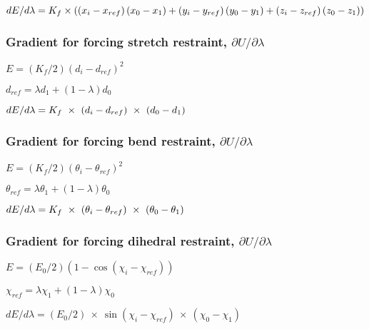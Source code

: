 $dE/d\lambda =K_{f}\times \left( \left( x_{i}-x_{ref}\right) \left(
x_{0}-x_{1}\right) +\left( y_{i}-y_{ref}\right) \left( y_{0}-y_{1}\right)
+\left( z_{i}-z_{ref}\right) \left( z_{0}-z_{1}\right) \right) \bigskip $

\subsubsection{Gradient for forcing stretch restraint, $\partial U/\partial \lambda $}

$E=\left( K_{f}/2\right) \left( d_{i}-d_{ref}\right) ^{2}$

$d_{ref}=\lambda d_{1}+\left( 1-\lambda \right) d_{0}$

$dE/d\lambda =K_{f}~\times ~\left( d_{i}-d_{ref}\right) ~\times ~\left(
d_{0}-d_{1}\right) \bigskip $

\subsubsection{Gradient for forcing bend restraint, $\partial U/\partial \lambda $}

$E=\left( K_{f}/2\right) \left( \theta _{i}-\theta _{ref}\right) ^{2}$

$\theta _{ref}=\lambda \theta _{1}+\left( 1-\lambda \right) \theta _{0}$

$dE/d\lambda =K_{f}~\times ~\left( \theta _{i}-\theta _{ref}\right) ~\times %
~\left( \theta _{0}-\theta _{1}\right) \bigskip $

\subsubsection{Gradient for forcing dihedral restraint, $\partial U/\partial \lambda $}

$E=\left( E_{0}/2\right) \left( 1-\cos \left( \chi _{i}-\chi _{ref}\right)
\right) $

$\chi _{ref}=\lambda \chi _{1}+\left( 1-\lambda \right) \chi _{0}$

$dE/d\lambda =\left( E_{0}/2\right) ~\times ~\sin \left( \chi _{i}-\chi
_{ref}\right) ~\times ~\left( \chi _{0}-\chi _{1}\right) $


